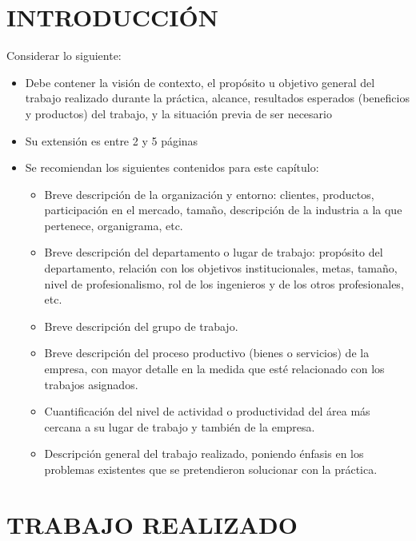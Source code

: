 \documentclass[oneside,12pt, letterpaper, titlepage]{book}
\begin{document}
\chapter[Introducción]{INTRODUCCIÓN}

Considerar lo siguiente: 
\begin{itemize}
    \item Debe contener la visión de contexto, el propósito u objetivo general del trabajo realizado durante la práctica, alcance, resultados esperados (beneficios y productos) del trabajo, y la situación previa de ser necesario 
    
    \item Su extensión es entre 2 y 5 páginas 
    
    \item Se recomiendan los siguientes contenidos para este capítulo: 
    \begin{itemize}
        \item Breve descripción de la organización y entorno: clientes, productos, participación en el mercado, tamaño, descripción de la industria a la que pertenece, organigrama, etc. 

        \item Breve descripción del departamento o lugar de trabajo: propósito del departamento, relación con los objetivos institucionales, metas, tamaño, nivel de profesionalismo, rol de los ingenieros y de los otros profesionales, etc. 

        \item Breve descripción del grupo de trabajo.

        \item Breve descripción del proceso productivo (bienes o servicios) de la empresa, con mayor detalle en la medida que esté relacionado con los trabajos asignados.

        \item Cuantificación del nivel de actividad o productividad del área más cercana a su lugar de trabajo y también de la empresa.

        \item Descripción general del trabajo realizado, poniendo énfasis en los problemas existentes que se pretendieron solucionar con la práctica.
    \end{itemize}
\end{itemize}


\chapter[Trabajo Realizado]{TRABAJO REALIZADO}
\end{document}
